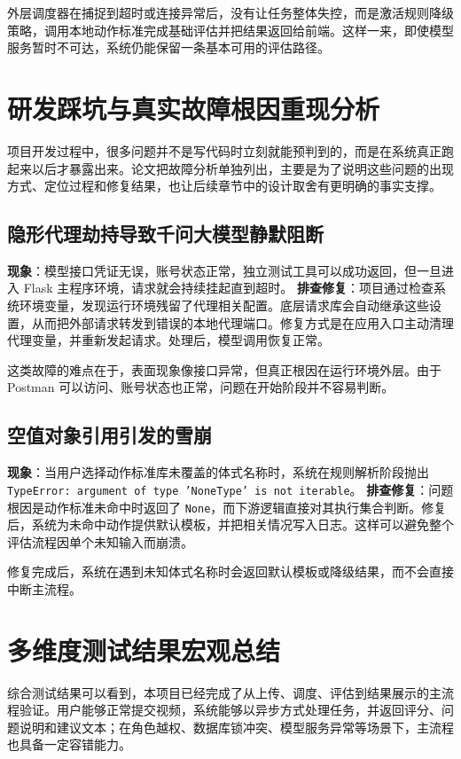 外层调度器在捕捉到超时或连接异常后，没有让任务整体失控，而是激活规则降级策略，调用本地动作标准完成基础评估并把结果返回给前端。这样一来，即使模型服务暂时不可达，系统仍能保留一条基本可用的评估路径。

\section{研发踩坑与真实故障根因重现分析}

项目开发过程中，很多问题并不是写代码时立刻就能预判到的，而是在系统真正跑起来以后才暴露出来。论文把故障分析单独列出，主要是为了说明这些问题的出现方式、定位过程和修复结果，也让后续章节中的设计取舍有更明确的事实支撑。

\subsection{隐形代理劫持导致千问大模型静默阻断}
\textbf{现象}：模型接口凭证无误，账号状态正常，独立测试工具可以成功返回，但一旦进入 Flask 主程序环境，请求就会持续挂起直到超时。
\textbf{排查修复}：项目通过检查系统环境变量，发现运行环境残留了代理相关配置。底层请求库会自动继承这些设置，从而把外部请求转发到错误的本地代理端口。修复方式是在应用入口主动清理代理变量，并重新发起请求。处理后，模型调用恢复正常。

这类故障的难点在于，表面现象像接口异常，但真正根因在运行环境外层。由于 Postman 可以访问、账号状态也正常，问题在开始阶段并不容易判断。

\subsection{空值对象引用引发的雪崩}
\textbf{现象}：当用户选择动作标准库未覆盖的体式名称时，系统在规则解析阶段抛出 \texttt{TypeError: argument of type 'NoneType' is not iterable}。
\textbf{排查修复}：问题根因是动作标准未命中时返回了 \texttt{None}，而下游逻辑直接对其执行集合判断。修复后，系统为未命中动作提供默认模板，并把相关情况写入日志。这样可以避免整个评估流程因单个未知输入而崩溃。

修复完成后，系统在遇到未知体式名称时会返回默认模板或降级结果，而不会直接中断主流程。

\section{多维度测试结果宏观总结}
综合测试结果可以看到，本项目已经完成了从上传、调度、评估到结果展示的主流程验证。用户能够正常提交视频，系统能够以异步方式处理任务，并返回评分、问题说明和建议文本；在角色越权、数据库锁冲突、模型服务异常等场景下，主流程也具备一定容错能力。

